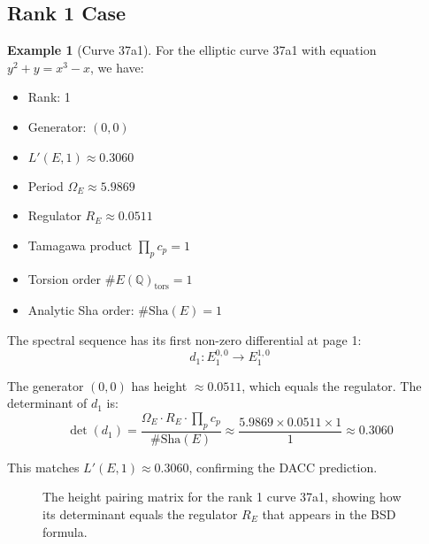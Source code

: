 \documentclass{article}
\theoremstyle{plain}
\theoremstyle{definition}
\newtheorem{example}[theorem]{Example}
\theoremstyle{remark}
\begin{document}
\subsection{Rank 1 Case}

\begin{example}[Curve 37a1]
For the elliptic curve 37a1 with equation $y^2 + y = x^3 - x$, we have:
\begin{itemize}
\item Rank: 1
\item Generator: $(0, 0)$
\item $L'(E,1) \approx 0.3060$
\item Period $\Omega_E \approx 5.9869$
\item Regulator $R_E \approx 0.0511$
\item Tamagawa product $\prod_p c_p = 1$
\item Torsion order $\#E(\mathbb{Q})_{\text{tors}} = 1$
\item Analytic Sha order: $\#\text{Sha}(E) = 1$
\end{itemize}

The spectral sequence has its first non-zero differential at page 1:
$$d_1: E_1^{0,0} \to E_1^{1,0}$$

The generator $(0,0)$ has height $\approx 0.0511$, which equals the regulator. The determinant of $d_1$ is:
$$\det(d_1) = \frac{\Omega_E \cdot R_E \cdot \prod_p c_p}{\#\text{Sha}(E)} \approx \frac{5.9869 \times 0.0511 \times 1}{1} \approx 0.3060$$

This matches $L'(E,1) \approx 0.3060$, confirming the DACC prediction.
\end{example}

\begin{figure}[htbp]
\centering
{}
\caption{The height pairing matrix for the rank 1 curve 37a1, showing how its determinant equals the regulator $R_E$ that appears in the BSD formula.}
\label{fig:rank1_height}
\end{figure}
\end{document}
